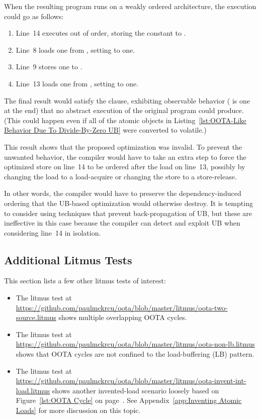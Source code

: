 \documentclass[10]{article}
\begin{document}
When the resulting program runs on a weakly ordered architecture,
the execution could go as follows:
\begin{enumerate}
\item	Line~14 executes out of order, storing the constant  to .
\item	Line~8 loads one from , setting  to one.
\item	Line~9 stores one to .
\item	Line~13 loads one from , setting  to one.
\end{enumerate}
The final result would satisfy the  clause,
exhibiting observable behavior ( is one at the end)
that no abstract execution of the original program could produce.
(This could happen even if all of the atomic objects in
Listing~\ref{lst:OOTA-Like Behavior Due To Divide-By-Zero UB}
were converted to volatile.)

This result shows that the proposed optimization was invalid.
To prevent the unwanted behavior, the compiler would have to take an
extra step to force the optimized store on line~14 to be ordered after
the load on line~13, possibly by changing the load to a load-acquire
or changing the store to a store-release.

In other words, the compiler would have to preserve the dependency-induced
ordering that the UB-based optimization would otherwise destroy.
It is tempting to consider using techniques
that prevent back-propagation of UB, but these are ineffective in this
case because the compiler can detect and exploit UB when
considering line~14 in isolation.

\subsection{Additional Litmus Tests}
\label{app:Additional Litmus Tests}

This section lists a few other litmus tests of interest:

\begin{itemize}
\item	The litmus test at
	\url{https://github.com/paulmckrcu/oota/blob/master/litmus/oota-two-source.litmus}
	shows multiple overlapping OOTA cycles.
\item	The litmus test at
	\url{https://github.com/paulmckrcu/oota/blob/master/litmus/oota-non-lb.litmus}
	shows that OOTA cycles are not confined to the load-buffering (LB)
	pattern.
\item	The litmus test at
	\url{https://github.com/paulmckrcu/oota/blob/master/litmus/oota-invent-int-load.litmus}
	shows another invented-load scenario loosely based on
	Figure~\ref{lst:OOTA Cycle}
	on
	page~\pageref{lst:OOTA Cycle}.
	See Appendix~\ref{app:Inventing Atomic Loads}
	for more discussion on this topic.
\end{itemize}
\end{document}
